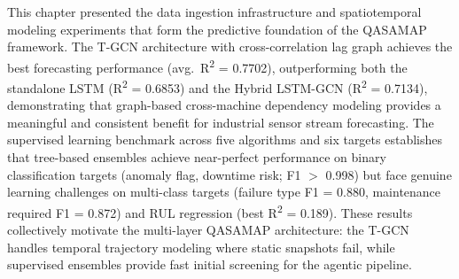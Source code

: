 This chapter presented the data ingestion infrastructure and spatiotemporal modeling experiments that form the predictive foundation of the QASAMAP framework. The T-GCN architecture with cross-correlation lag graph achieves the best forecasting performance (avg.\ R\textsuperscript{2} = 0.7702), outperforming both the standalone LSTM (R\textsuperscript{2} = 0.6853) and the Hybrid LSTM-GCN (R\textsuperscript{2} = 0.7134), demonstrating that graph-based cross-machine dependency modeling provides a meaningful and consistent benefit for industrial sensor stream forecasting. The supervised learning benchmark across five algorithms and six targets establishes that tree-based ensembles achieve near-perfect performance on binary classification targets (anomaly flag, downtime risk; F1 $>$ 0.998) but face genuine learning challenges on multi-class targets (failure type F1 = 0.880, maintenance required F1 = 0.872) and RUL regression (best R\textsuperscript{2} = 0.189). These results collectively motivate the multi-layer QASAMAP architecture: the T-GCN handles temporal trajectory modeling where static snapshots fail, while supervised ensembles provide fast initial screening for the agentic pipeline.
